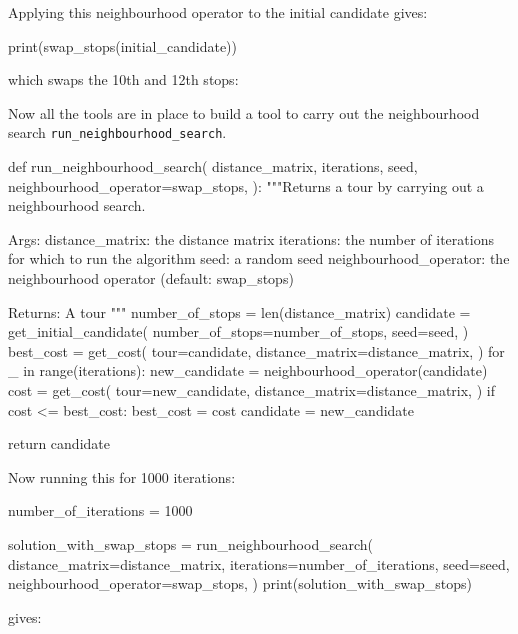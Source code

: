 Applying this neighbourhood operator to the initial candidate gives:

\begin{pyin}
print(swap_stops(initial_candidate))
\end{pyin}

which swaps the 10th and 12th stops:

\begin{pyout}
[0, 7, 12, 5, 11, 3, 9, 2, 8, 1, 4, 10, 6, 0]
\end{pyout}

Now all the tools are in place to build a tool to carry out the
neighbourhood search \texttt{run_neighbourhood_search}.

\begin{pyin}
def run_neighbourhood_search(
    distance_matrix,
    iterations,
    seed,
    neighbourhood_operator=swap_stops,
):
    """Returns a tour by carrying out a neighbourhood search.

    Args:
        distance_matrix: the distance matrix
        iterations: the number of iterations for which to
                    run the algorithm
        seed: a random seed
        neighbourhood_operator: the neighbourhood operator
                                (default: swap_stops)

    Returns:
        A tour
    """
    number_of_stops = len(distance_matrix)
    candidate = get_initial_candidate(
        number_of_stops=number_of_stops,
        seed=seed,
    )
    best_cost = get_cost(
        tour=candidate,
        distance_matrix=distance_matrix,
    )
    for _ in range(iterations):
        new_candidate = neighbourhood_operator(candidate)
        cost = get_cost(
            tour=new_candidate,
            distance_matrix=distance_matrix,
        )
        if cost <= best_cost:
            best_cost = cost
            candidate = new_candidate

    return candidate
\end{pyin}

Now running this for 1000 iterations:

\begin{pyin}
number_of_iterations = 1000

solution_with_swap_stops = run_neighbourhood_search(
    distance_matrix=distance_matrix,
    iterations=number_of_iterations,
    seed=seed,
    neighbourhood_operator=swap_stops,
)
print(solution_with_swap_stops)
\end{pyin}

gives:

